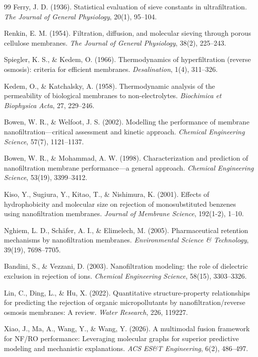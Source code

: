 \documentclass[11pt]{article}
\begin{document}
\begin{thebibliography}{99}
 Ferry, J. D. (1936). Statistical evaluation of sieve constants in ultrafiltration. \textit{The Journal of General Physiology}, 20(1), 95--104.

 Renkin, E. M. (1954). Filtration, diffusion, and molecular sieving through porous cellulose membranes. \textit{The Journal of General Physiology}, 38(2), 225--243.

 Spiegler, K. S., \& Kedem, O. (1966). Thermodynamics of hyperfiltration (reverse osmosis): criteria for efficient membranes. \textit{Desalination}, 1(4), 311--326.

 Kedem, O., \& Katchalsky, A. (1958). Thermodynamic analysis of the permeability of biological membranes to non-electrolytes. \textit{Biochimica et Biophysica Acta}, 27, 229--246.

 Bowen, W. R., \& Welfoot, J. S. (2002). Modelling the performance of membrane nanofiltration---critical assessment and kinetic approach. \textit{Chemical Engineering Science}, 57(7), 1121--1137.

 Bowen, W. R., \& Mohammad, A. W. (1998). Characterization and prediction of nanofiltration membrane performance---a general approach. \textit{Chemical Engineering Science}, 53(19), 3399--3412.

 Kiso, Y., Sugiura, Y., Kitao, T., \& Nishimura, K. (2001). Effects of hydrophobicity and molecular size on rejection of monosubstituted benzenes using nanofiltration membranes. \textit{Journal of Membrane Science}, 192(1-2), 1--10.

 Nghiem, L. D., Sch\"afer, A. I., \& Elimelech, M. (2005). Pharmaceutical retention mechanisms by nanofiltration membranes. \textit{Environmental Science \& Technology}, 39(19), 7698--7705.

 Bandini, S., \& Vezzani, D. (2003). Nanofiltration modeling: the role of dielectric exclusion in rejection of ions. \textit{Chemical Engineering Science}, 58(15), 3303--3326.

 Lin, C., Ding, L., \& Hu, X. (2022). Quantitative structure-property relationships for predicting the rejection of organic micropollutants by nanofiltration/reverse osmosis membranes: A review. \textit{Water Research}, 226, 119227.

 Xiao, J., Ma, A., Wang, Y., \& Wang, Y. (2026). A multimodal fusion framework for NF/RO performance: Leveraging molecular graphs for superior predictive modeling and mechanistic explanations. \textit{ACS ES\&T Engineering}, 6(2), 486--497.


\end{thebibliography}
\end{document}
